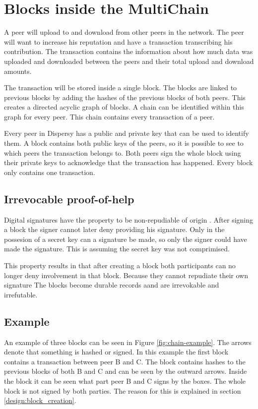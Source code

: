 \section{Blocks inside the MultiChain}
A peer will upload to and download from other peers in the network.
The peer will want to increase his reputation and have a transaction transcribing his contribution.
The transaction contains the information about how much data was uploaded and downloaded between the peers
and their total upload and download amounts.

The transaction will be stored inside a single block.
The blocks are linked to previous blocks by adding the hashes of the previous blocks of both peers.
This creates a directed acyclic graph of blocks.
A chain can be identified within this graph for every peer.
This chain contains every transaction of a peer.

Every peer in Dispersy has a public and private key that can be used to identify them.
A block contains both public keys of the peers,
so it is possible to see to which peers the transaction belongs to.
Both peers sign the whole block using their private keys to acknowledge that the transaction has happened.
Every block only contains one transaction.

\subsection{Irrevocable proof-of-help}
Digital signatures have the property to be non-repudiable of origin \cite{VanderLubbe-crypto}.
After signing a block the signer cannot later deny providing his signature.
Only in the possesion of a secret key can a signature be made,
so only the signer could have made the signature.
This is assuming the secret key was not comprimised.

This property results in that after creating a block
both participants can no longer deny involvement in that block.
Because they cannot repudiate their own signature
The blocks become durable records aand are irrevokable and irrefutable.

\subsection{Example}

An example of three blocks can be seen in Figure \ref{fig:chain-example}.
The arrows denote that something is hashed or signed.
In this example the first block contains a transaction between peer B and C.
The block contains hashes to the previous blocks of both B and C
and can be seen by the outward arrows.
Inside the block it can be seen what part peer B and C signs by the boxes.
The whole block is not signed by both parties.
The reason for this is explained in section \ref{design:block_creation}.

